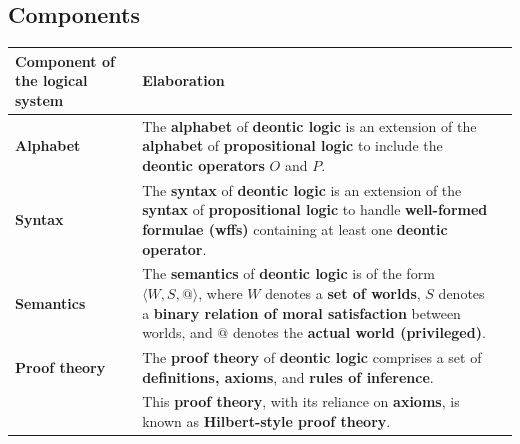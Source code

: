 \documentclass[11pt]{article}
\begin{document}
\subsection{Components}
\label{sec:org51f9e3e}
\begin{center}
\begin{tabularx}{\textwidth}{|X|X|X|}
\hline
Component of the logical system & Elaboration\\
\hline
\textbf{Alphabet} & The \textbf{alphabet} of \textbf{deontic logic} is an extension of the \textbf{alphabet} of \textbf{propositional logic} to include the \textbf{deontic operators} \(O\) and \(P\).\\
\hline
\textbf{Syntax} & The \textbf{syntax} of \textbf{deontic logic} is an extension of the \textbf{syntax} of \textbf{propositional logic} to handle \textbf{well-formed formulae (wffs)} containing at least one \textbf{deontic operator}.\\
\hline
\textbf{Semantics} & The \textbf{semantics} of \textbf{deontic logic} is of the form \(\langle W, S, @ \rangle\), where \(W\) denotes a \textbf{set of worlds}, \(S\) denotes a \textbf{binary relation of moral satisfaction} between worlds, and \(@\) denotes the \textbf{actual world (privileged)}.\\
\hline
\textbf{Proof theory} & The \textbf{proof theory} of \textbf{deontic logic} comprises a set of \textbf{definitions, axioms}, and \textbf{rules of inference}.\\
 & This \textbf{proof theory}, with its reliance on \textbf{axioms}, is known as \textbf{Hilbert-style proof theory}.\\
\hline
\end{tabularx}
\end{center}
\end{document}
